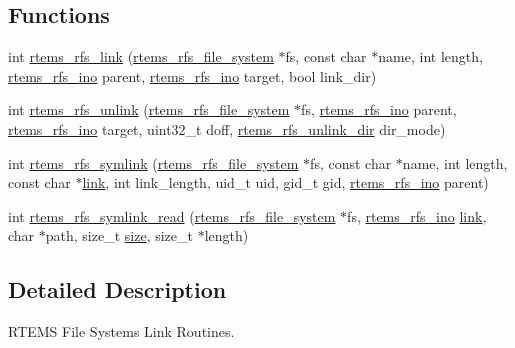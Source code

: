 \subsection*{Functions}
\begin{DoxyCompactItemize}
\item 
int \mbox{\hyperlink{rtems-rfs-link_8c_a21b4f5283c14d67044a3eb7710059e80}{rtems\+\_\+rfs\+\_\+link}} (\mbox{\hyperlink{struct__rtems__rfs__file__system}{rtems\+\_\+rfs\+\_\+file\+\_\+system}} $\ast$fs, const char $\ast$name, int length, \mbox{\hyperlink{rtems-rfs-inode_8h_ae658325c3ff9941f2e68315d20e3c723}{rtems\+\_\+rfs\+\_\+ino}} parent, \mbox{\hyperlink{rtems-rfs-inode_8h_ae658325c3ff9941f2e68315d20e3c723}{rtems\+\_\+rfs\+\_\+ino}} target, bool link\+\_\+dir)
\item 
int \mbox{\hyperlink{rtems-rfs-link_8c_a688547629f6f92228919b7938a1cbfb4}{rtems\+\_\+rfs\+\_\+unlink}} (\mbox{\hyperlink{struct__rtems__rfs__file__system}{rtems\+\_\+rfs\+\_\+file\+\_\+system}} $\ast$fs, \mbox{\hyperlink{rtems-rfs-inode_8h_ae658325c3ff9941f2e68315d20e3c723}{rtems\+\_\+rfs\+\_\+ino}} parent, \mbox{\hyperlink{rtems-rfs-inode_8h_ae658325c3ff9941f2e68315d20e3c723}{rtems\+\_\+rfs\+\_\+ino}} target, uint32\+\_\+t doff, \mbox{\hyperlink{rtems-rfs-link_8h_aa5069a5066794404a5afb31ac6067cd0}{rtems\+\_\+rfs\+\_\+unlink\+\_\+dir}} dir\+\_\+mode)
\item 
int \mbox{\hyperlink{rtems-rfs-link_8c_ad174cb40689aacab6621b9df946bc3f3}{rtems\+\_\+rfs\+\_\+symlink}} (\mbox{\hyperlink{struct__rtems__rfs__file__system}{rtems\+\_\+rfs\+\_\+file\+\_\+system}} $\ast$fs, const char $\ast$name, int length, const char $\ast$\mbox{\hyperlink{link_8c_a8c94afd0b7e5bb4ce95fefd964241f7f}{link}}, int link\+\_\+length, uid\+\_\+t uid, gid\+\_\+t gid, \mbox{\hyperlink{rtems-rfs-inode_8h_ae658325c3ff9941f2e68315d20e3c723}{rtems\+\_\+rfs\+\_\+ino}} parent)
\item 
int \mbox{\hyperlink{rtems-rfs-link_8c_a41b4368e951ea5b33913fd5e1a7d2c80}{rtems\+\_\+rfs\+\_\+symlink\+\_\+read}} (\mbox{\hyperlink{struct__rtems__rfs__file__system}{rtems\+\_\+rfs\+\_\+file\+\_\+system}} $\ast$fs, \mbox{\hyperlink{rtems-rfs-inode_8h_ae658325c3ff9941f2e68315d20e3c723}{rtems\+\_\+rfs\+\_\+ino}} \mbox{\hyperlink{link_8c_a8c94afd0b7e5bb4ce95fefd964241f7f}{link}}, char $\ast$path, size\+\_\+t \mbox{\hyperlink{sun4u_2tte_8h_a245260f6f74972558f61b85227df5aae}{size}}, size\+\_\+t $\ast$length)
\end{DoxyCompactItemize}


\subsection{Detailed Description}
R\+T\+E\+MS File Systems Link Routines. 

